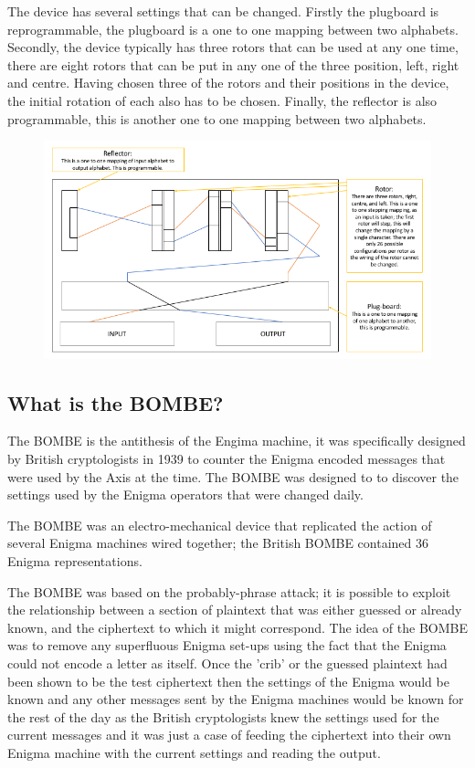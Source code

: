 \documentclass[12pt,a4paper]{article}
\begin{document}
The device has several settings that can be changed. Firstly the plugboard is reprogrammable, the plugboard is a one to one mapping between two alphabets. Secondly, the device typically has three rotors that can be used at any one time, there are eight rotors that can be put in any one of the three position, left, right and centre. Having chosen three of the rotors and their positions in the device, the initial rotation of each also has to be chosen. Finally, the reflector is also programmable, this is another one to one mapping between two alphabets.

\begin{figure}[h]
\centering
\includegraphics[width=\textwidth]{enigmaDiagram.png}
\end{figure}

\subsection{What is the BOMBE?}

The BOMBE is the antithesis of the Engima machine, it was specifically designed by British cryptologists in 1939 to counter the Enigma encoded messages that were used by the Axis at the time. The BOMBE was designed to to discover the settings used by the Enigma operators that were changed daily. 

The BOMBE was an electro-mechanical device that replicated the action of several Enigma machines wired together; the British BOMBE contained 36 Enigma representations.

The BOMBE was based on the probably-phrase attack; it is possible to exploit the relationship between a section of plaintext that was either guessed or already known, and the ciphertext to which it might correspond. The idea of the BOMBE was to remove any superfluous Enigma set-ups using the fact that the Enigma could not encode a letter as itself. Once the 'crib' or the guessed plaintext had been shown to be the test ciphertext then the settings of the Enigma would be known and any other messages sent by the Enigma machines would be known for the rest of the day as the British cryptologists knew the settings used for the current messages and it was just a case of feeding the ciphertext into their own Enigma machine with the current settings and reading the output.
\end{document}
